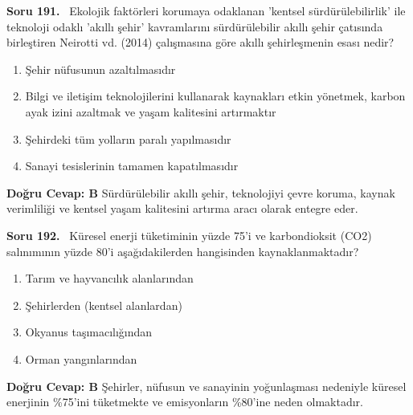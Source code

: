 \documentclass[11pt,a4paper,openany]{book}
\begin{document}
\needspace{5cm}
\vspace{8pt}
\noindent\textbf{\large\sffamily Soru 191.} \ Ekolojik faktörleri korumaya odaklanan 'kentsel sürdürülebilirlik' ile teknoloji odaklı 'akıllı şehir' kavramlarını sürdürülebilir akıllı şehir çatısında birleştiren Neirotti vd. (2014) çalışmasına göre akıllı şehirleşmenin esası nedir?
\begin{enumerate}[label=\Alph*), leftmargin=25pt, topsep=4pt, itemsep=2pt]
    \item Şehir nüfusunun azaltılmasıdır
    \item Bilgi ve iletişim teknolojilerini kullanarak kaynakları etkin yönetmek, karbon ayak izini azaltmak ve yaşam kalitesini artırmaktır
    \item Şehirdeki tüm yolların paralı yapılmasıdır
    \item Sanayi tesislerinin tamamen kapatılmasıdır
\end{enumerate}
\vspace{4pt}
\begin{tcolorbox}[title=Cevap ve Açıklama, colback=gray!3!white, colframe=primarycolor!90!black, arc=2mm, fonttitle=\bfseries\sffamily, top=6pt, bottom=6pt]
    \textbf{Doğru Cevap: B}
    \vspace{2pt}
    Sürdürülebilir akıllı şehir, teknolojiyi çevre koruma, kaynak verimliliği ve kentsel yaşam kalitesini artırma aracı olarak entegre eder.
\end{tcolorbox}
\vspace{10pt}

\needspace{5cm}
\vspace{8pt}
\noindent\textbf{\large\sffamily Soru 192.} \ Küresel enerji tüketiminin yüzde 75'i ve karbondioksit (CO2) salınımının yüzde 80'i aşağıdakilerden hangisinden kaynaklanmaktadır?
\begin{enumerate}[label=\Alph*), leftmargin=25pt, topsep=4pt, itemsep=2pt]
    \item Tarım ve hayvancılık alanlarından
    \item Şehirlerden (kentsel alanlardan)
    \item Okyanus taşımacılığından
    \item Orman yangınlarından
\end{enumerate}
\vspace{4pt}
\begin{tcolorbox}[title=Cevap ve Açıklama, colback=gray!3!white, colframe=primarycolor!90!black, arc=2mm, fonttitle=\bfseries\sffamily, top=6pt, bottom=6pt]
    \textbf{Doğru Cevap: B}
    \vspace{2pt}
    Şehirler, nüfusun ve sanayinin yoğunlaşması nedeniyle küresel enerjinin \%75'ini tüketmekte ve emisyonların \%80'ine neden olmaktadır.
\end{tcolorbox}
\vspace{10pt}
\end{document}
